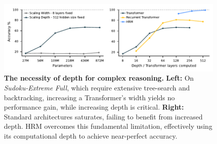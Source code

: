 \begin{figure}[t]
\centering
\includegraphics[width=0.9\linewidth]{figures/depth_param_performance/depth_param_performance.pdf} 
\caption{\textbf{The necessity of depth for complex reasoning.} \textbf{Left:} On \textit{Sudoku-Extreme Full}, which require extensive tree-search and backtracking, increasing a Transformer's width yields no performance gain, while increasing depth is critical. \textbf{Right:} Standard architectures saturates, failing to benefit from increased depth. HRM overcomes this fundamental limitation, effectively using its computational depth to achieve near-perfect accuracy.}
\label{fig:perf-layers}
\end{figure}
